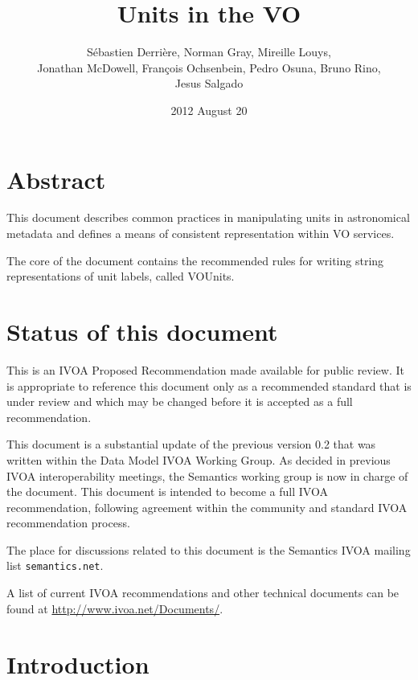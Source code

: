 \documentclass[12pt,notitlepage,onecolumn]{ivoa}
\title{Units in the VO}
\date{2012 August 20}
\author{S\'{e}bastien Derri\`ere, Norman Gray, Mireille Louys, \\
Jonathan McDowell, Fran\c{c}ois Ochsenbein, Pedro Osuna, Bruno Rino, \\
Jesus Salgado}
\begin{document}
\maketitle %
\newpage
\tableofcontents 
\newpage
\section*{Abstract}

This document describes common practices in manipulating
units in astronomical metadata and defines a means of consistent
representation within VO services.

The core of the document contains the recommended rules for writing string representations 
of unit labels, called VOUnits.

\section*{Status of this document}

This is an IVOA Proposed Recommendation made available for public review.
It is appropriate to reference this document only as a recommended standard 
that is under review and which may be changed before it is accepted as a full recommendation.


This document is a substantial update of the previous version 0.2 that
was written within the Data Model IVOA Working Group. As decided in previous
IVOA interoperability meetings, the Semantics working group is now in charge 
of the document. This document is intended to become a full IVOA recommendation,
following agreement within the community and standard IVOA recommendation process.

The place for discussions related to this document is the
Semantics IVOA mailing list {\tt semantics\@@ivoa.net}.


A list of current IVOA recommendations and other technical documents can be found at
\url{http://www.ivoa.net/Documents/}.

\section{Introduction}
\end{document}
